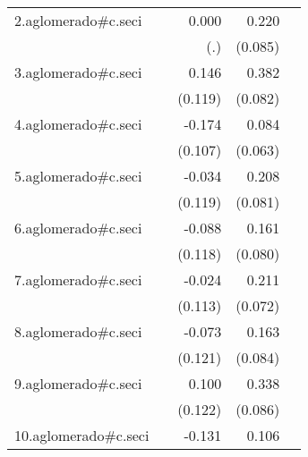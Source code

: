 {\begin{longtable}{l*{4}{D{.}{.}{-1}}}
\addlinespace
2.aglomerado#c.seci&                     &       0.000         &       0.220\sym{**} &                     \\
            &                     &         (.)         &     (0.085)         &                     \\
\addlinespace
3.aglomerado#c.seci&                     &       0.146         &       0.382\sym{***}&                     \\
            &                     &     (0.119)         &     (0.082)         &                     \\
\addlinespace
4.aglomerado#c.seci&                     &      -0.174         &       0.084         &                     \\
            &                     &     (0.107)         &     (0.063)         &                     \\
\addlinespace
5.aglomerado#c.seci&                     &      -0.034         &       0.208\sym{*}  &                     \\
            &                     &     (0.119)         &     (0.081)         &                     \\
\addlinespace
6.aglomerado#c.seci&                     &      -0.088         &       0.161\sym{*}  &                     \\
            &                     &     (0.118)         &     (0.080)         &                     \\
\addlinespace
7.aglomerado#c.seci&                     &      -0.024         &       0.211\sym{**} &                     \\
            &                     &     (0.113)         &     (0.072)         &                     \\
\addlinespace
8.aglomerado#c.seci&                     &      -0.073         &       0.163         &                     \\
            &                     &     (0.121)         &     (0.084)         &                     \\
\addlinespace
9.aglomerado#c.seci&                     &       0.100         &       0.338\sym{***}&                     \\
            &                     &     (0.122)         &     (0.086)         &                     \\
\addlinespace
10.aglomerado#c.seci&                     &      -0.131         &       0.106         &                     \\

\end{longtable}}
